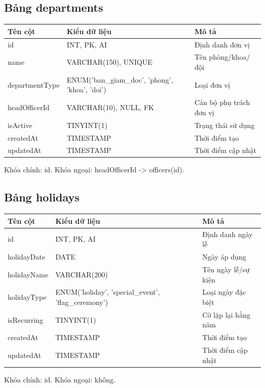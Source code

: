 \documentclass[18pt,a4paper]{report}
\begin{document}
\subsection{Bảng departments}
\begin{longtable}{|>{\raggedright\arraybackslash}p{4.5cm}|>{\raggedright\arraybackslash}p{4.5cm}|>{\raggedright\arraybackslash}p{6.5cm}|}
\hline
\textbf{Tên cột} & \textbf{Kiểu dữ liệu} & \textbf{Mô tả} \\ \hline
id & INT, PK, AI & Định danh đơn vị \\ \hline
name & VARCHAR(150), UNIQUE & Tên phòng/khoa/đội \\ \hline
departmentType & ENUM('ban\_giam\_doc', 'phong', 'khoa', 'doi') & Loại đơn vị \\ \hline
headOfficerId & VARCHAR(10), NULL, FK & Cán bộ phụ trách đơn vị \\ \hline
isActive & TINYINT(1) & Trạng thái sử dụng \\ \hline
createdAt & TIMESTAMP & Thời điểm tạo \\ \hline
updatedAt & TIMESTAMP & Thời điểm cập nhật \\ \hline
\end{longtable}
Khóa chính: id. Khóa ngoại: headOfficerId -> officers(id).

\subsection{Bảng holidays}
\begin{longtable}{|>{\raggedright\arraybackslash}p{4.5cm}|>{\raggedright\arraybackslash}p{4.5cm}|>{\raggedright\arraybackslash}p{6.5cm}|}
\hline
\textbf{Tên cột} & \textbf{Kiểu dữ liệu} & \textbf{Mô tả} \\ \hline
id & INT, PK, AI & Định danh ngày lễ \\ \hline
holidayDate & DATE & Ngày áp dụng \\ \hline
holidayName & VARCHAR(200) & Tên ngày lễ/sự kiện \\ \hline
holidayType & ENUM('holiday', 'special\_event', 'flag\_ceremony') & Loại ngày đặc biệt \\ \hline
isRecurring & TINYINT(1) & Cờ lặp lại hằng năm \\ \hline
createdAt & TIMESTAMP & Thời điểm tạo \\ \hline
updatedAt & TIMESTAMP & Thời điểm cập nhật \\ \hline
\end{longtable}
Khóa chính: id. Khóa ngoại: không.
\end{document}
